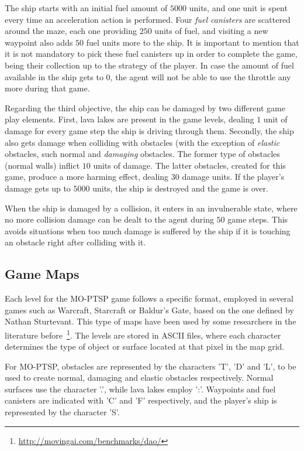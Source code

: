 \documentclass[conference]{IEEEtran}
\begin{document}
The ship starts with an initial fuel amount of $5000$ units, and one unit is spent every time an acceleration action is performed. Four \textit{fuel canisters} are scattered around the maze, each one providing $250$ units of fuel, and visiting a new waypoint also adds $50$ fuel units more to the ship. It is important to mention that it is not mandatory to pick these fuel canisters up in order to complete the game, being their collection up to the strategy of the player. In case the amount of fuel available in the ship gets to $0$, the agent will not be able to use the throttle any more during that game. 

Regarding the third objective, the ship can be damaged by two different game play elements. First, lava lakes are present in the game levels, dealing $1$ unit of damage for every game step the ship is driving through them. Secondly, the ship also gets damage when colliding with obstacles (with the exception of \textit{elastic} obstacles, such normal and \textit{damaging} obstacles. The former type of obstacles (normal walls) inflict $10$ units of damage. The latter obstacles, created for this game, produce a more harming effect, dealing $30$ damage units. If the player's damage gets up to $5000$ units, the ship is destroyed and the game is over.

When the ship is damaged by a collision, it enters in an invulnerable state, where no more collision damage can be dealt to the agent during $50$ game steps. This avoids situations when too much damage is suffered by the ship if it is touching an obstacle right after colliding with it.

\subsection{Game Maps}

Each level for the MO-PTSP game follows a specific format, employed in several games such as Warcraft, Starcraft or Baldur's Gate, based on the one defined by Nathan Sturtevant. This type of maps have been used by some researchers in the literature before~\footnote{\url{http://movingai.com/benchmarks/dao/}}. The levels are stored in ASCII files, where each character determines the type of object or surface located at that pixel in the map grid. 

For MO-PTSP, obstacles are represented by the characters 'T', 'D' and 'L', to be used to create normal, damaging and elastic obstacles respectively. Normal surfaces use the character '.', while lava lakes employ ':'. Waypoints and fuel canisters are indicated with 'C' and 'F' respectively, and the player's ship is represented by the character 'S'.
\end{document}
